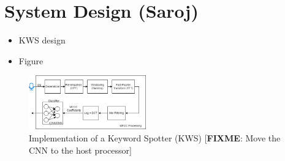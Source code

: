 \section{System Design (Saroj)}
\label{sec:system_design}
\begin{itemize}
    \item KWS design
    \item Figure
\end{itemize}

\begin{figure}[htbp]	
    \includegraphics[width=0.45\textwidth]{figs/KWS-architecture.png}
    \caption{Implementation of a Keyword Spotter (KWS) [\textbf{FIXME}: Move the CNN to the host processor]}
    \label{fig:KWS_Arch}
\end{figure}

